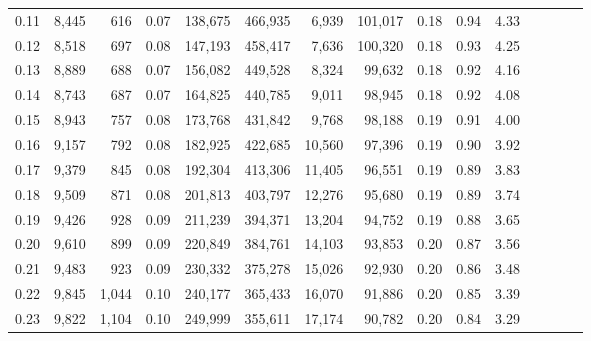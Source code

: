 \begin{tabular}{rrrcrrrrrrrrrrr}
0.11 &   8,445 &     616 &                                       0.07 &  138,675 &  466,935 &    6,939 &  101,017 &  0.18 &  0.94 &                         4.33 \\
0.12 &   8,518 &     697 &                                       0.08 &  147,193 &  458,417 &    7,636 &  100,320 &  0.18 &  0.93 &                         4.25 \\
0.13 &   8,889 &     688 &                                       0.07 &  156,082 &  449,528 &    8,324 &   99,632 &  0.18 &  0.92 &                         4.16 \\
0.14 &   8,743 &     687 &                                       0.07 &  164,825 &  440,785 &    9,011 &   98,945 &  0.18 &  0.92 &                         4.08 \\
0.15 &   8,943 &     757 &                                       0.08 &  173,768 &  431,842 &    9,768 &   98,188 &  0.19 &  0.91 &                         4.00 \\
0.16 &   9,157 &     792 &                                       0.08 &  182,925 &  422,685 &   10,560 &   97,396 &  0.19 &  0.90 &                         3.92 \\
0.17 &   9,379 &     845 &                                       0.08 &  192,304 &  413,306 &   11,405 &   96,551 &  0.19 &  0.89 &                         3.83 \\
0.18 &   9,509 &     871 &                                       0.08 &  201,813 &  403,797 &   12,276 &   95,680 &  0.19 &  0.89 &                         3.74 \\
0.19 &   9,426 &     928 &                                       0.09 &  211,239 &  394,371 &   13,204 &   94,752 &  0.19 &  0.88 &                         3.65 \\
0.20 &   9,610 &     899 &                                       0.09 &  220,849 &  384,761 &   14,103 &   93,853 &  0.20 &  0.87 &                         3.56 \\
0.21 &   9,483 &     923 &                                       0.09 &  230,332 &  375,278 &   15,026 &   92,930 &  0.20 &  0.86 &                         3.48 \\
0.22 &   9,845 &   1,044 &                                       0.10 &  240,177 &  365,433 &   16,070 &   91,886 &  0.20 &  0.85 &                         3.39 \\
0.23 &   9,822 &   1,104 &                                       0.10 &  249,999 &  355,611 &   17,174 &   90,782 &  0.20 &  0.84 &                         3.29 \\

\end{tabular}
